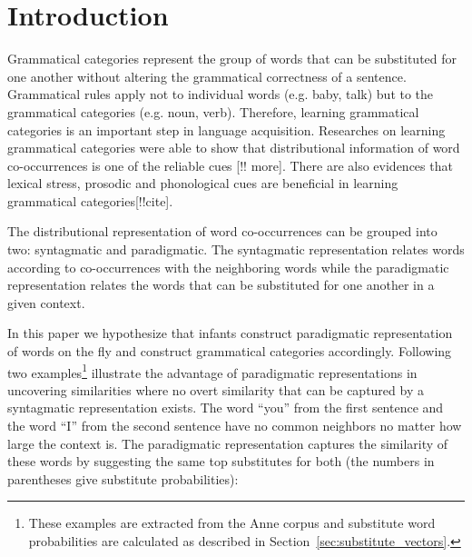 \section{Introduction}
\label{sec:introduction}
Grammatical categories represent the group of words that can be substituted for
one another without altering the grammatical correctness of a sentence.
Grammatical rules apply not to individual words (e.g. baby, talk) but to the
grammatical categories (e.g. noun, verb).  Therefore, learning grammatical
categories is an important step in language acquisition.  Researches on
learning grammatical categories were able to show that distributional
information of word co-occurrences is one of the reliable cues
\citep*{Mintz200391,clair2010}[!!  more].  There are also evidences that
lexical stress, prosodic and phonological cues are beneficial in learning
grammatical categories[!!cite]. 

The distributional representation of word co-occurrences can be grouped into
two: syntagmatic and paradigmatic.  The syntagmatic representation relates
words according to co-occurrences with the neighboring words while the
paradigmatic representation relates the words that can be substituted for one
another in a given context.

In this paper we hypothesize that infants construct paradigmatic representation
of words on the fly and construct grammatical categories accordingly.
Following two examples\footnote{These examples are extracted from the Anne
  corpus and substitute word probabilities are calculated as described in
  Section~\ref{sec:substitute_vectors}.} illustrate the advantage of
  paradigmatic representations in uncovering similarities where no overt
  similarity that can be captured by a syntagmatic representation exists. The
  word ``you'' from the first sentence and the word ``I'' from the second
  sentence have no common neighbors no matter how large the context is.  The
  paradigmatic representation captures the similarity of these words by
  suggesting the same top substitutes for both (the numbers in parentheses give
  substitute probabilities): 

